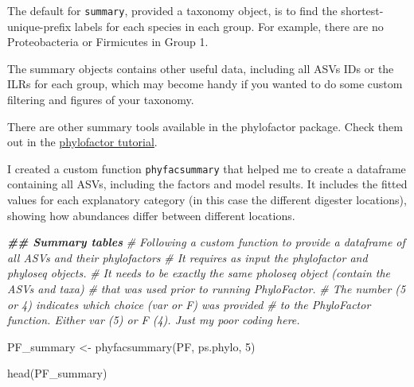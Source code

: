 \documentclass[
]{book}
\newenvironment{Shaded}{\begin{snugshade}}{\end{snugshade}}
\newcommand{\CommentTok}[1]{\textcolor[rgb]{0.56,0.35,0.01}{\textit{#1}}}
\newcommand{\DecValTok}[1]{\textcolor[rgb]{0.00,0.00,0.81}{#1}}
\newcommand{\DocumentationTok}[1]{\textcolor[rgb]{0.56,0.35,0.01}{\textbf{\textit{#1}}}}
\newcommand{\FunctionTok}[1]{\textcolor[rgb]{0.00,0.00,0.00}{#1}}
\newcommand{\NormalTok}[1]{#1}
\newcommand{\OtherTok}[1]{\textcolor[rgb]{0.56,0.35,0.01}{#1}}
\begin{document}
The default for \texttt{summary}, provided a taxonomy object, is to find the shortest-unique-prefix labels for each species in each group. For example, there are no Proteobacteria or Firmicutes in Group 1.

The summary objects contains other useful data, including all ASVs IDs or the ILRs for each group, which may become handy if you wanted to do some custom filtering and figures of your taxonomy.

There are other summary tools available in the phylofactor package. Check them out in the \href{https://docs.wixstatic.com/ugd/0119a1_099ae20df8424af9a38585dcebc0d45a.pdf}{phylofactor tutorial}.

I created a custom function \texttt{phyfacsummary} that helped me to create a dataframe containing all ASVs, including the factors and model results. It includes the fitted values for each explanatory category (in this case the different digester locations), showing how abundances differ between different locations.

\begin{Shaded}
\begin{Highlighting}[]
\DocumentationTok{\#\# Summary tables}
\CommentTok{\# Following a custom function to provide a dataframe of all ASVs and their phylofactors }
\CommentTok{\# It requires as input the phylofactor and phyloseq objects. }
\CommentTok{\# It needs to be exactly the same pholoseq object (contain the ASVs and taxa) }
\CommentTok{\# that was used prior to running PhyloFactor. }
\CommentTok{\# The number (5 or 4) indicates which \textasciigrave{}choice\textasciigrave{} (\textquotesingle{}var\textquotesingle{} or \textquotesingle{}F\textquotesingle{}) was provided }
\CommentTok{\# to the PhyloFactor function. Either \textquotesingle{}var\textquotesingle{} (5) or \textquotesingle{}F\textquotesingle{} (4). Just my poor coding here.   }

\NormalTok{PF\_summary }\OtherTok{\textless{}{-}} \FunctionTok{phyfacsummary}\NormalTok{(PF, ps.phylo, }\DecValTok{5}\NormalTok{)  }
  
\FunctionTok{head}\NormalTok{(PF\_summary)}
\end{Highlighting}
\end{Shaded}
\end{document}
